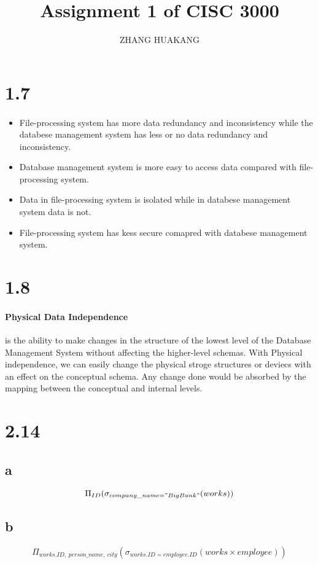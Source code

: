 \documentclass{article}
\title{Assignment 1 of CISC 3000}
\author{ZHANG HUAKANG}
\begin{document}
    \maketitle
    \section*{1.7}
    \paragraph{}
    \begin{itemize}
        \item File-processing system has more data redundancy and inconsistency while the databese management system has less or no data redundancy and inconsistency.
        \item Database management system is more easy to access data compared with file-processing system.
        \item Data in file-processing system is isolated while in databese management system data is not.
        \item File-processing system has kess secure comapred with databese management system.
    \end{itemize}
    \section*{1.8}
    \paragraph{Physical Data Independence}is the ability to make changes in the structure of the lowest level of the Database Management System without affecting the higher-level schemas. With Physical independence, we can easily change the physical stroge structures or deviecs with an effect on the conceptual schema. Any change done would be absorbed by the mapping between the conceptual and internal levels.
    \section*{2.14}
    \subsection*{a} $$\Pi_{ID}(\sigma_{company\_name="BigBank"}(works))$$
    \subsection*{b} $$\Pi_{works.ID,\  person\_name, \ city}(\sigma_{works.ID=employee.ID}(works \times employee))$$
\end{document}
